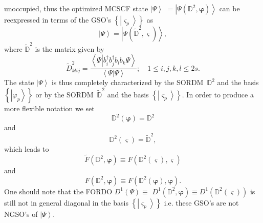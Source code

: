 \documentclass{preprint}
\begin{document}
unoccupied, thus the optimized MCSCF state $\left\vert \Psi \right\rangle $ $%
=\left\vert \Psi \left( \mathbb{D}^{2},\bm{\varphi}\right) \right\rangle $
can be reexpressed in terms of the GSO's $\left\{ \left\vert \varsigma
_{p}\right\rangle \right\} $ as
\begin{equation}
\left\vert \Psi \right\rangle =\left\vert \Psi \left( \mathbb{\tilde{D}}^{2},%
\bm{\varsigma}\right) \right\rangle ,
\end{equation}%
where $\mathbb{\tilde{D}}^{2}$ is the matrix given by
\begin{equation}
\tilde{D}_{klij}^{2}=\frac{\left\langle \Psi \left\vert b_{i}^{\dagger
}b_{j}^{\dagger }b_{l}b_{k}\Psi \right. \right\rangle }{\left\langle \left.
\Psi \right\vert \Psi \right\rangle };\quad 1\leq i,j,k,l\leq 2s.
\end{equation}%
The state $\left\vert \Psi \right\rangle $ is thus completely characterized
by the SORDM\ $\mathbb{D}^{2}$ and the basis $\left\{ \left\vert \varphi
_{p}\right\rangle \right\} $ or by the SORDM\ $\mathbb{\tilde{D}}^{2}$ and
the basis $\left\{ \left\vert \varsigma _{p}\right\rangle \right\} $. In
order to produce a more flexible notation we set
\begin{equation}
\mathbb{D}^{2}\left( \bm{\varphi}\right) =\mathbb{D}^{2}
\end{equation}%
and
\begin{equation}
\mathbb{D}^{2}\left( \bm{\varsigma}\right) =\mathbb{\tilde{D}}^{2},
\end{equation}%
which leads to
\begin{equation}
\tilde{F}\left( \mathbb{D}^{2},\bm{\varphi}\right) \equiv F\left( \mathbb{D}%
^{2}\left( \bm{\varsigma}\right) ,\bm{\varsigma}\right)
\end{equation}%
and
\begin{equation}
F\left( \mathbb{D}^{2},\bm{\varphi}\right) \equiv F\left( \mathbb{D}%
^{2}\left( \bm{\varphi}\right) ,\bm{\varphi}\right) .
\end{equation}%
One should note that the FORDO $D^{1}\left( \Psi \right) \equiv $ $%
D^{1}\left( \mathbb{D}^{2},\bm{\varphi}\right) \equiv D^{1}\left( \mathbb{D}%
^{2}\left( \bm{\varsigma}\right) \right) $ is still not in general diagonal
in the basis $\left\{ \left\vert \varsigma _{p}\right\rangle \right\} $ i.e.
these GSO's are not NGSO's of $\left\vert \Psi \right\rangle $.
\end{document}
